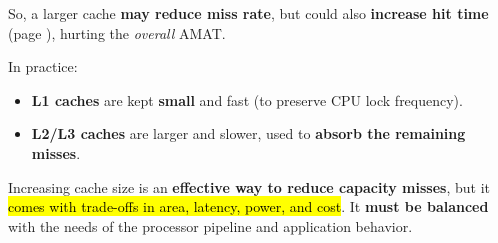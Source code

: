 \noindent
So, a larger cache \textbf{may reduce miss rate}, but could also \textbf{increase hit time} (page ), hurting the \emph{overall} AMAT.

\highspace
In practice:
\begin{itemize}
    \item \textbf{L1 caches} are kept \textbf{small} and fast (to preserve CPU lock frequency).
    \item \textbf{L2/L3 caches} are larger and slower, used to \textbf{absorb the remaining misses}.
\end{itemize}
Increasing cache size is an \textbf{effective way to reduce capacity misses}, but it \hl{comes with trade-offs in area, latency, power, and cost}. It \textbf{must be balanced} with the needs of the processor pipeline and application behavior.
